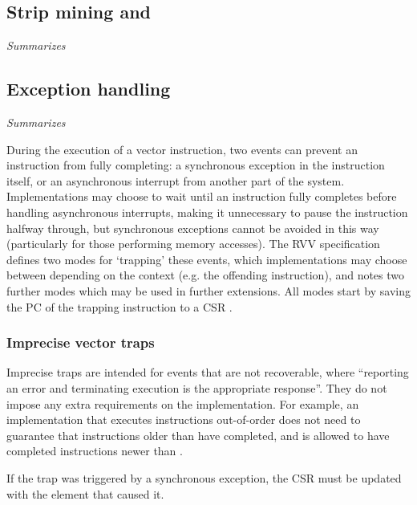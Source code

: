 \pagebreak
\subsection{Strip mining and }
\emph{Summarizes \cite[Section 6]{RISCVVectorExtension2021}}

\pagebreak
\subsection{Exception handling}
\emph{Summarizes \cite[Section 17]{RISCVVectorExtension2021}}

During the execution of a vector instruction, two events can prevent an instruction from fully completing: a synchronous exception in the instruction itself, or an asynchronous interrupt from another part of the system.
Implementations may choose to wait until an instruction fully completes before handling asynchronous interrupts, making it unnecessary to pause the instruction halfway through, but synchronous exceptions cannot be avoided in this way (particularly for those performing memory accesses).
The RVV specification defines two modes for `trapping' these events, which implementations may choose between depending on the context (e.g. the offending instruction), and notes two further modes which may be used in further extensions.
All modes start by saving the PC of the trapping instruction to a CSR .

\subsubsection{Imprecise vector traps}
Imprecise traps are intended for events that are not recoverable, where \enquote{reporting an error and terminating execution is the appropriate response}.
They do not impose any extra requirements on the implementation.
For example, an implementation that executes instructions out-of-order does not need to guarantee that instructions older than  have completed, and is allowed to have completed instructions newer than .

If the trap was triggered by a synchronous exception, the  CSR must be updated with the element that caused it.

